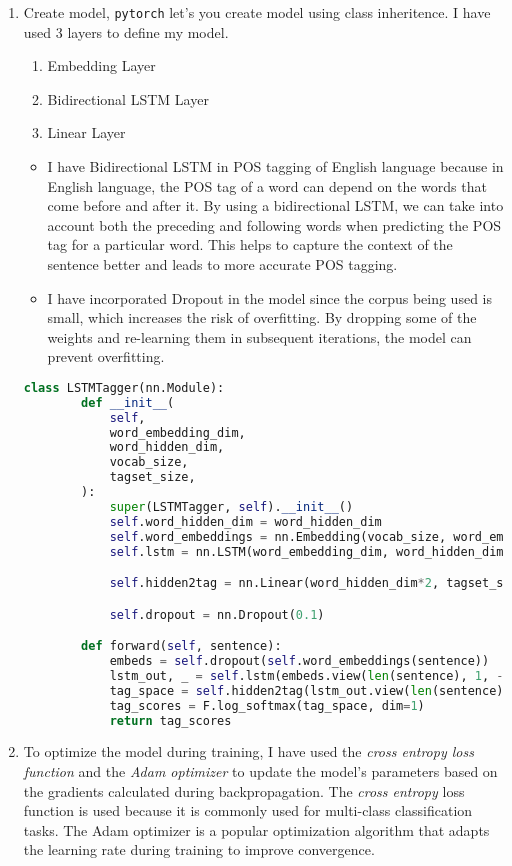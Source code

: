 \begin{enumerate}
	\item Create model, \texttt{pytorch} let's you create model using class inheritence. I have used 3 layers to define my model.
		\begin{enumerate}
			\item Embedding Layer
			\item Bidirectional LSTM Layer
			\item Linear Layer
		\end{enumerate}
		\begin{itemize}
			\item I have Bidirectional LSTM in POS tagging of English language because in English language, the POS tag of a word can depend on the words that come before and after it. By using a bidirectional LSTM, we can take into account both the preceding and following words when predicting the POS tag for a particular word. This helps to capture the context of the sentence better and leads to more accurate POS tagging.
			\item I have incorporated Dropout in the model since the corpus being used is small, which increases the risk of overfitting. By dropping some of the weights and re-learning them in subsequent iterations, the model can prevent overfitting.
		\end{itemize}
	\begin{lstlisting}[language=Python]
	class LSTMTagger(nn.Module):
    	def __init__(
        	self,
        	word_embedding_dim,
        	word_hidden_dim,
        	vocab_size,
        	tagset_size,
    	):
        	super(LSTMTagger, self).__init__()
        	self.word_hidden_dim = word_hidden_dim
        	self.word_embeddings = nn.Embedding(vocab_size, word_embedding_dim)
        	self.lstm = nn.LSTM(word_embedding_dim, word_hidden_dim, num_layers = 1, bidirectional = True)

        	self.hidden2tag = nn.Linear(word_hidden_dim*2, tagset_size)

        	self.dropout = nn.Dropout(0.1)

    	def forward(self, sentence):
        	embeds = self.dropout(self.word_embeddings(sentence))
        	lstm_out, _ = self.lstm(embeds.view(len(sentence), 1, -1))
        	tag_space = self.hidden2tag(lstm_out.view(len(sentence), -1))
        	tag_scores = F.log_softmax(tag_space, dim=1)
        	return tag_scores

	\end{lstlisting}
	
	\item To optimize the model during training, I have used the \textit{cross entropy loss function} and the \textit{Adam optimizer} to update the model's parameters based on the gradients calculated during backpropagation. The \textit{cross entropy} loss function is used because it is commonly used for multi-class classification tasks. The Adam optimizer is a popular optimization algorithm that adapts the learning rate during training to improve convergence.


\end{enumerate}
